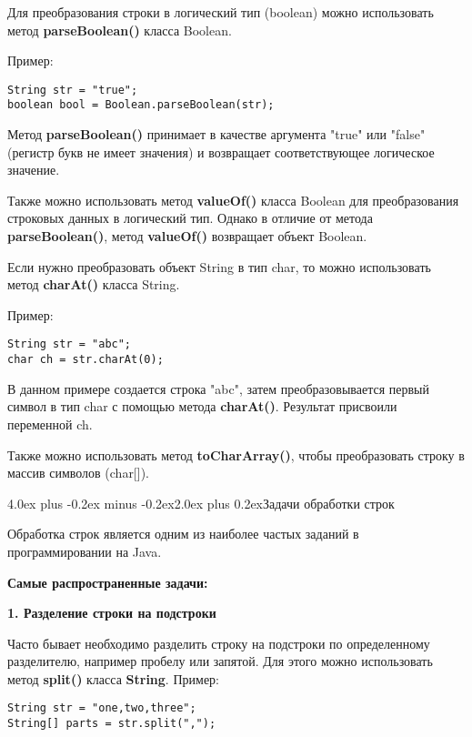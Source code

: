 \documentclass[12pt, a4paper]{book}%
\makeatletter
\renewcommand{\section}{\@startsection{section}{1}{1pt}%
{4.0ex plus -0.2ex minus -0.2ex}{2.0ex plus 0.2ex}{\centering\bf}}%
\makeatother
\begin{document}
{Для преобразования строки в логический тип (boolean) можно использовать метод {\bf parseBoolean()} класса Boolean. 

Пример:

\begin{lstlisting}
String str = "true";
boolean bool = Boolean.parseBoolean(str);
\end{lstlisting}

Метод {\bf parseBoolean()} принимает в качестве аргумента "true" или "false" (регистр букв не имеет значения) и возвращает соответствующее логическое значение.

Также можно использовать метод {\bf valueOf()} класса Boolean для преобразования строковых данных в логический тип. Однако в отличие от метода {\bf parseBoolean()}, метод {\bf valueOf()} возвращает объект Boolean.

Если нужно преобразовать объект String в тип char, то можно использовать метод {\bf charAt()} класса String. 

Пример:

\begin{lstlisting}
String str = "abc";
char ch = str.charAt(0);
\end{lstlisting}

В данном примере создается строка "abc", затем преобразовывается первый символ в тип char с помощью метода {\bf charAt()}. Результат присвоили переменной ch.

Также можно использовать метод {\bf toCharArray()}, чтобы преобразовать строку в массив символов (char[]).

\section{Задачи обработки строк}

Обработка строк является одним из наиболее частых заданий в программировании на Java. 

{\bf Самые распространенные задачи:}

{\bf 1. Разделение строки на подстроки}

Часто бывает необходимо разделить строку на подстроки по определенному разделителю, например пробелу или запятой. Для этого можно использовать метод {\bf split()} класса {\bf String}. 
\newpage
Пример:

\begin{lstlisting}
String str = "one,two,three";
String[] parts = str.split(",");
\end{lstlisting}

}
\end{document}
